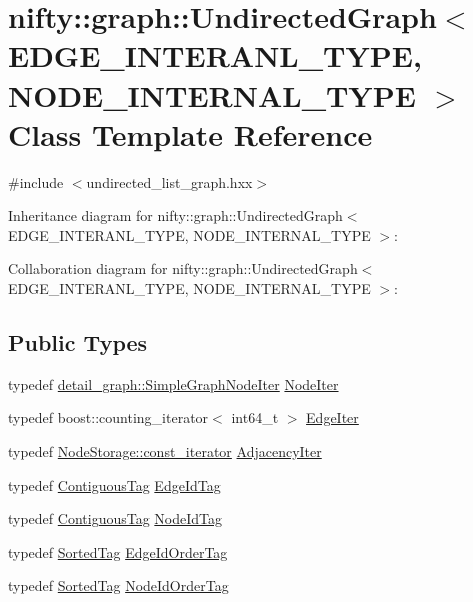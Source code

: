 \hypertarget{classnifty_1_1graph_1_1UndirectedGraph}{}\section{nifty\+:\+:graph\+:\+:Undirected\+Graph$<$ E\+D\+G\+E\+\_\+\+I\+N\+T\+E\+R\+A\+N\+L\+\_\+\+T\+Y\+P\+E, N\+O\+D\+E\+\_\+\+I\+N\+T\+E\+R\+N\+A\+L\+\_\+\+T\+Y\+P\+E $>$ Class Template Reference}
\label{classnifty_1_1graph_1_1UndirectedGraph}


{\ttfamily \#include $<$undirected\+\_\+list\+\_\+graph.\+hxx$>$}



Inheritance diagram for nifty\+:\+:graph\+:\+:Undirected\+Graph$<$ E\+D\+G\+E\+\_\+\+I\+N\+T\+E\+R\+A\+N\+L\+\_\+\+T\+Y\+P\+E, N\+O\+D\+E\+\_\+\+I\+N\+T\+E\+R\+N\+A\+L\+\_\+\+T\+Y\+P\+E $>$\+:


Collaboration diagram for nifty\+:\+:graph\+:\+:Undirected\+Graph$<$ E\+D\+G\+E\+\_\+\+I\+N\+T\+E\+R\+A\+N\+L\+\_\+\+T\+Y\+P\+E, N\+O\+D\+E\+\_\+\+I\+N\+T\+E\+R\+N\+A\+L\+\_\+\+T\+Y\+P\+E $>$\+:
\subsection*{Public Types}
\begin{DoxyCompactItemize}
\item 
typedef \hyperlink{classnifty_1_1graph_1_1detail__graph_1_1SimpleGraphNodeIter}{detail\+\_\+graph\+::\+Simple\+Graph\+Node\+Iter} \hyperlink{classnifty_1_1graph_1_1UndirectedGraph_aac54e4ad3a525489e9b29c1bd4c92c88}{Node\+Iter}
\item 
typedef boost\+::counting\+\_\+iterator$<$ int64\+\_\+t $>$ \hyperlink{classnifty_1_1graph_1_1UndirectedGraph_aa37a0dc690ad1257d5eb5105e7d66bba}{Edge\+Iter}
\item 
typedef \hyperlink{classnifty_1_1container_1_1FlatSet_a0f4cd26da060859b18742abfd534aa24}{Node\+Storage\+::const\+\_\+iterator} \hyperlink{classnifty_1_1graph_1_1UndirectedGraph_adecb4597d23d097b08c2c03a106bc57b}{Adjacency\+Iter}
\item 
typedef \hyperlink{structnifty_1_1graph_1_1ContiguousTag}{Contiguous\+Tag} \hyperlink{classnifty_1_1graph_1_1UndirectedGraph_a5e5a59e9d25ab322da5e8286cadc3e00}{Edge\+Id\+Tag}
\item 
typedef \hyperlink{structnifty_1_1graph_1_1ContiguousTag}{Contiguous\+Tag} \hyperlink{classnifty_1_1graph_1_1UndirectedGraph_a5d11b1e802f0be2f967b62f7ea5ff61e}{Node\+Id\+Tag}
\item 
typedef \hyperlink{structnifty_1_1graph_1_1SortedTag}{Sorted\+Tag} \hyperlink{classnifty_1_1graph_1_1UndirectedGraph_a2f74e8de961bf80dc037ceedf58c46a4}{Edge\+Id\+Order\+Tag}
\item 
typedef \hyperlink{structnifty_1_1graph_1_1SortedTag}{Sorted\+Tag} \hyperlink{classnifty_1_1graph_1_1UndirectedGraph_a0756fdeac9df76a32f46f2969ffacd80}{Node\+Id\+Order\+Tag}
\end{DoxyCompactItemize}
